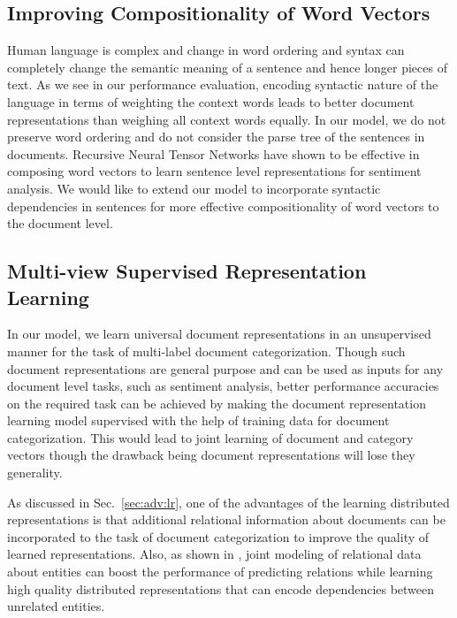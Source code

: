 \subsection{Improving Compositionality of Word Vectors}
Human language is complex and change in word ordering and syntax can completely change the semantic meaning of a sentence and hence longer pieces of text. 
As we see in our performance evaluation, encoding syntactic nature of the language in terms of weighting the context words leads to better document representations than weighing all context words equally. 
In our model, we do not preserve word ordering and do not consider the parse tree of the sentences in documents. 
Recursive Neural Tensor Networks \citep{socher2013recursive} have shown to be effective in composing word vectors to learn sentence level representations for sentiment analysis. 
We would like to extend our model to incorporate syntactic dependencies in sentences for more effective compositionality of word vectors to the document level.

\subsection{Multi-view Supervised Representation Learning}
In our model, we learn universal document representations in an unsupervised manner for the task of multi-label document categorization. 
Though such document representations are general purpose and can be used as inputs for any document level tasks, such as sentiment analysis, better performance accuracies on the required task can be achieved by making the document representation learning model supervised with the help of training data for document categorization. This would lead to joint learning of document and category vectors though the drawback being document representations will lose they generality.

As discussed in Sec.~\ref{sec:adv:lr}, one of the advantages of the learning distributed representations is that additional relational information about documents can be incorporated to the task of document categorization to improve the quality of learned representations. Also, as shown in \citet{gupta2015collectively}, joint modeling of relational data about entities can boost the performance of predicting relations while learning high quality distributed representations that can encode dependencies between unrelated entities. 
